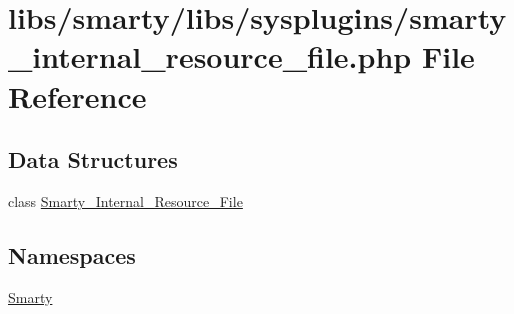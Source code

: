 \hypertarget{smarty__internal__resource__file_8php}{}\section{libs/smarty/libs/sysplugins/smarty\+\_\+internal\+\_\+resource\+\_\+file.php File Reference}
\label{smarty__internal__resource__file_8php}
\subsection*{Data Structures}
\begin{DoxyCompactItemize}
\item 
class \hyperlink{class_smarty___internal___resource___file}{Smarty\+\_\+\+Internal\+\_\+\+Resource\+\_\+\+File}
\end{DoxyCompactItemize}
\subsection*{Namespaces}
\begin{DoxyCompactItemize}
\item 
 \hyperlink{namespace_smarty}{Smarty}
\end{DoxyCompactItemize}
